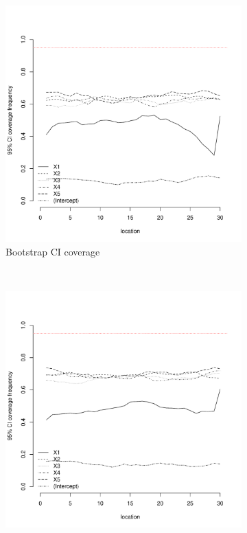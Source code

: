 \documentclass[authoryear, review, 11pt]{elsarticle}
\begin{document}
\begin{figure}
	\vspace{-30mm}
	\centering
	\begin{subfigure}[b]{0.45\textwidth}
	\centering
		\includegraphics[width=\textwidth]{../../figures/simulation/15.6.profile_bootstrap_coverage.pdf}
		\caption{Bootstrap CI coverage}
	\end{subfigure}%
	~ %
	\begin{subfigure}[b]{0.45\textwidth}
	\centering
		\includegraphics[width=\textwidth]{../../figures/simulation/15.6.profile_se_coverage.pdf}

\end{subfigure}
\end{figure}
\end{document}
